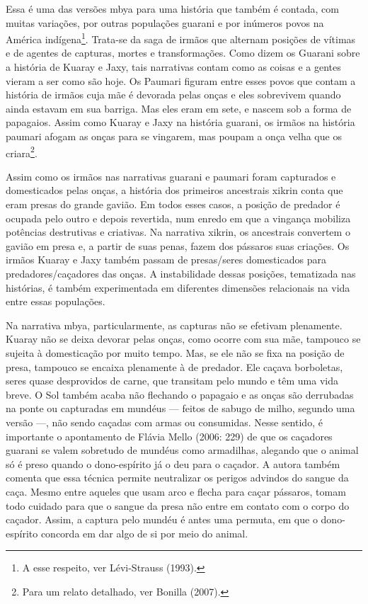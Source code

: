 Essa é uma das versões mbya para uma história que também é contada, com
muitas variações, por outras populações guarani e por inúmeros povos na
América indígena\footnote{A esse respeito, ver Lévi-Strauss (1993).}.
Trata-se da saga de irmãos que alternam posições de vítimas e de agentes
de capturas, mortes e transformações. Como dizem os Guarani sobre a
história de Kuaray e Jaxy, tais narrativas contam como as coisas e a
gentes vieram a ser como são hoje. Os Paumari figuram entre esses povos
que contam a história de irmãos cuja mãe é devorada pelas onças e eles
sobrevivem quando ainda estavam em sua barriga. Mas eles eram em sete, e
nascem sob a forma de papagaios. Assim como Kuaray e Jaxy na história
guarani, os irmãos na história paumari afogam as onças para se vingarem,
mas poupam a onça velha que os criara\footnote{Para um relato detalhado,
  ver Bonilla (2007).}.

Assim como os irmãos nas narrativas guarani e paumari foram capturados e
domesticados pelas onças, a história dos primeiros ancestrais xikrin
conta que eram presas do grande gavião. Em todos esses casos, a posição
de predador é ocupada pelo outro e depois revertida, num enredo em que a
vingança mobiliza potências destrutivas e criativas. Na narrativa
xikrin, os ancestrais convertem o gavião em presa e, a partir de suas
penas, fazem dos pássaros suas criações. Os irmãos Kuaray e Jaxy também
passam de presas/seres domesticados para predadores/caçadores das onças.
A instabilidade dessas posições, tematizada nas histórias, é também
experimentada em diferentes dimensões relacionais na vida entre essas
populações.

Na narrativa mbya, particularmente, as capturas não se efetivam
plenamente. Kuaray não se deixa devorar pelas onças, como ocorre com sua
mãe, tampouco se sujeita à domesticação por muito tempo. Mas, se ele não
se fixa na posição de presa, tampouco se encaixa plenamente à de
predador. Ele caçava borboletas, seres quase desprovidos de carne, que
transitam pelo mundo e têm uma vida breve. O Sol também acaba não
flechando o papagaio e as onças são derrubadas na ponte ou capturadas em
mundéus --- feitos de sabugo de milho, segundo uma versão ---, não sendo
caçadas com armas ou consumidas. Nesse sentido, é importante o
apontamento de Flávia Mello (2006: 229) de que os caçadores guarani se
valem sobretudo de mundéus como armadilhas, alegando que o animal só é
preso quando o dono-espírito já o deu para o caçador. A autora também
comenta que essa técnica permite neutralizar os perigos advindos do
sangue da caça. Mesmo entre aqueles que usam arco e flecha para caçar
pássaros, tomam todo cuidado para que o sangue da presa não entre em
contato com o corpo do caçador. Assim, a captura pelo mundéu é antes uma
permuta, em que o dono-espírito concorda em dar algo de si por meio do
animal.

